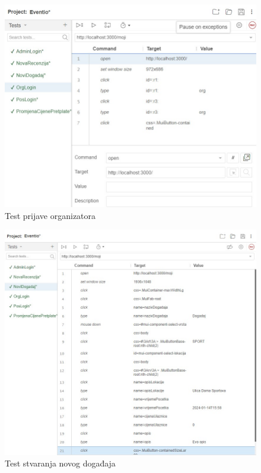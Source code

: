 			\begin{figure}[H]
				\includegraphics[scale=0.45]{testovi/selOrgLogin.jpeg}
				\centering
				\caption{Test prijave organizatora}
				\label{fig:promjene}
			\end{figure}
			
			\begin{figure}[H]
				\includegraphics[scale=0.45]{testovi/selNoviDogadaj.jpeg}
				\centering
				\caption{Test stvaranja novog događaja}
				\label{fig:promjene}
			\end{figure}
			
